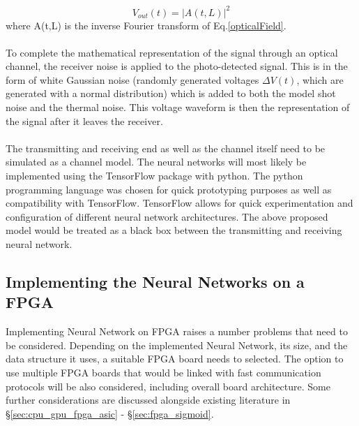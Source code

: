 \begin{equation}
    V_{out}(t) = |A(t,L)|^2
\end{equation}
    where A(t,L) is the inverse Fourier transform of Eq.\ref{opticalField}.
\\
\\
To complete the mathematical representation of the signal through an optical channel, the receiver noise is applied to the photo-detected signal. This is in the form of white Gaussian noise (randomly generated voltages $\Delta V(t)$, which are generated with a normal distribution) which is added to both the model shot noise and the thermal noise. This voltage waveform is then the representation of the signal after it leaves the receiver.
\\
\\
The transmitting and receiving end as well as the channel itself need to be simulated as a channel model. The neural networks will most likely be implemented using the TensorFlow package with python. The python programming language was chosen for quick prototyping purposes as well as compatibility with TensorFlow. TensorFlow allows for quick experimentation and configuration of different neural network architectures. The above proposed model would be treated as a black box between the transmitting and receiving neural network. 

\subsection{Implementing the Neural Networks on a FPGA}

Implementing Neural Network on FPGA raises a number problems that need to be considered. Depending on the implemented Neural Network, its size, and the data structure it uses, a suitable FPGA board needs to selected. The option to use multiple FPGA boards that would be linked with fast communication protocols will be also considered, including overall board architecture. Some further considerations are discussed alongside existing literature in \S \ref{sec:cpu_gpu_fpga_asic} - \S \ref{sec:fpga_sigmoid}.



